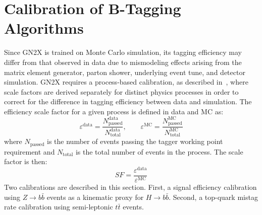 

\section{Calibration of B-Tagging Algorithms}

Since GN2X is trained on Monte Carlo simulation, its tagging efficiency may differ from that observed in data due to mismodeling effects arising from the matrix element generator, parton shower, underlying event tune, and detector simulation. 
GN2X requires a process-based calibration, as described in~\cite{XbbCalib}, where scale factors are derived separately for distinct physics processes in order to correct for the difference in tagging efficiency between data and simulation. 
The efficiency scale factor for a given process is defined in data and MC as:
%
\begin{equation}
	\varepsilon^{\text{data}} = \frac{N^{\text{data}}_{\text{passed}}}{N^{\text{data}}_{\text{total}}}, \qquad
	\varepsilon^{\text{MC}} = \frac{N^{\text{MC}}_{\text{passed}}}{N^{\text{MC}}_{\text{total}}}
\end{equation}
%
where $N_{\text{passed}}$ is the number of events passing the tagger working point requirement and $N_{\text{total}}$ is the total number of events in the process. 
The scale factor is then:
%
\begin{equation}
	SF = \frac{\varepsilon^{\text{data}}}{\varepsilon^{\text{MC}}}
	\label{eq:SF}
\end{equation}
%
Two calibrations are described in this section. 
First, a signal efficiency calibration using $Z \rightarrow b\bar{b}$ events as a kinematic proxy for $H \rightarrow b\bar{b}$. 
Second, a top-quark mistag rate calibration using semi-leptonic $t\bar{t}$ events.

